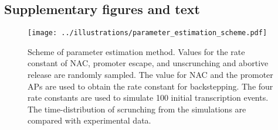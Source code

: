 \subsection{Supplementary figures and text}

\begin{figure}
    \begin{center}
      \texttt{[image: ../illustrations/parameter\_estimation\_scheme.pdf]}
    \end{center}
    \caption{Scheme of parameter estimation method. Values for the rate
    constant of NAC, promoter escape, and unscrunching and abortive release
    are randomly sampled. The value for NAC and the promoter APs are used to
    obtain the rate constant for backstepping. The four rate constants are
    used to simulate 100 initial transcription events. The time-distribution
    of scrunching from the simulations are compared with experimental data.}
    \label{fig:parameter_estimation_scheme}
\end{figure}
